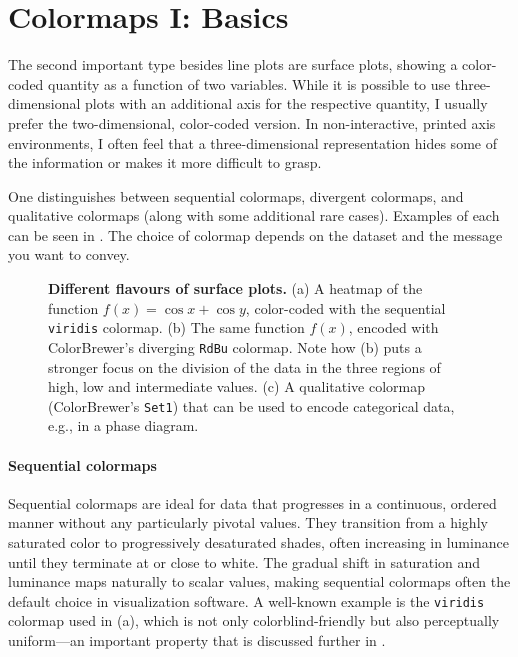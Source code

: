 \section{Colormaps I: Basics}

The second important type besides line plots are surface plots, showing a color-coded quantity as a function of two variables. While it is possible to use three-dimensional plots with an additional axis for the respective quantity, I usually prefer the two-dimensional, color-coded version. In non-interactive, printed axis environments, I often feel that a three-dimensional representation hides some of the information or makes it more difficult to grasp.

One distinguishes between sequential colormaps, divergent colormaps, and qualitative colormaps (along with some additional rare cases). Examples of each can be seen in . The choice of colormap depends on the dataset and the message you want to convey.

\begin{figure}
	\centering
	
	\caption{\textbf{Different flavours of surface plots.} (a) A heatmap of the function $f(x) = \cos x + \cos y$, color-coded with the sequential \texttt{viridis} colormap. (b) The same function $f(x)$, encoded with ColorBrewer’s diverging \texttt{RdBu} colormap. Note how (b) puts a stronger focus on the division of the data in the three regions of high, low and intermediate values. (c) A qualitative colormap (ColorBrewer's \texttt{Set1}) that can be used to encode categorical data, e.g., in a phase diagram.}
	\label{fig:surfaceplotflavours}
\end{figure}


\paragraph{Sequential colormaps}
Sequential colormaps are ideal for data that progresses in a continuous, ordered manner without any particularly pivotal values. They transition from a highly saturated color to progressively desaturated shades, often increasing in luminance until they terminate at or close to white. The gradual shift in saturation and luminance maps naturally to scalar values, making sequential colormaps often the default choice in visualization software. A well-known example is the \texttt{viridis} colormap used in (a), which is not only colorblind-friendly but also perceptually uniform---an important property that is discussed further in .

